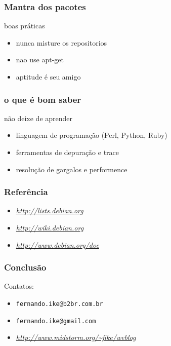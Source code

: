 \documentclass{beamer}
\begin{document}
\begin{frame}
    \frametitle{Mantra dos pacotes}
        \begin{block}{boas práticas}
	 \begin{itemize}
	    \item nunca misture os repositorios
	    \item nao use apt-get
	    \item aptitude é seu amigo 
         \end{itemize}
    \end{block}
\end{frame}

\begin{frame}
    \frametitle{o que é bom saber}
        \begin{block}{não deixe de aprender}
	 \begin{itemize}
            \item linguagem de programação (Perl, Python, Ruby)
	    \item ferramentas de depuração e trace
            \item resolução de gargalos e performence
         \end{itemize}
    \end{block}
\end{frame}


\begin{frame}
    \frametitle{\textbf{Referência}}
    \begin{block}{ }
        \begin{itemize}
            \item {\textit{\url{http://lists.debian.org}}}
            \item {\textit{\url{http://wiki.debian.org}}}
            \item {\textit{\url{http://www.debian.org/doc}}}
        \end{itemize}
    \end{block}

\end{frame}





\begin{frame}
    \frametitle{\textbf{Conclusão}}
    \begin{block}{Contatos:}
        \begin{itemize}
            \item {\texttt{fernando.ike@b2br.com.br}}
            \item {\texttt{fernando.ike@gmail.com}}
            \item {\textit{\url{ http://www.midstorm.org/~fike/weblog}}}
        \end{itemize}
    \end{block}

\end{frame}
\end{document}
